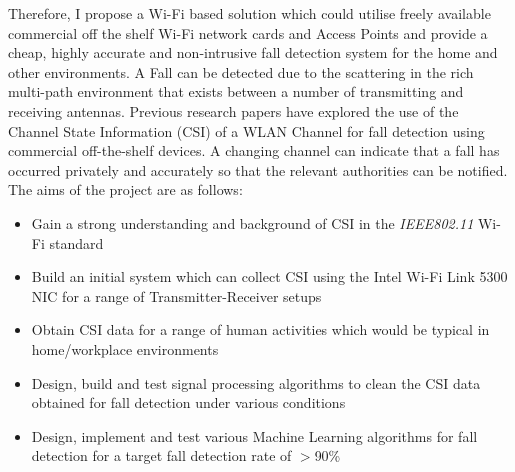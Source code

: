 Therefore, I propose a Wi-Fi based solution which could utilise freely available commercial off the shelf Wi-Fi network cards and Access Points and provide a cheap, highly accurate and non-intrusive fall detection system for the home and other environments. A Fall can be detected due to the scattering in the rich multi-path environment that exists between a number of transmitting and receiving antennas. Previous research papers have explored the use of the Channel State Information (CSI) of a WLAN Channel for fall detection using commercial off-the-shelf devices. A changing channel can indicate that a fall has occurred privately and accurately so that the relevant authorities can be notified. \\
The aims of the project are as follows: 
\begin{itemize}[noitemsep, topsep=0pt]
\item Gain a strong understanding and background of CSI in the \textit{IEEE802.11} Wi-Fi standard 
\item Build an initial system which can collect CSI using the Intel Wi-Fi Link 5300 NIC for a range of Transmitter-Receiver setups
\item Obtain CSI data for a range of human activities which would be typical in home/workplace environments
\item Design, build and test signal processing algorithms to clean the CSI data obtained for fall detection under various conditions
\item Design, implement and test various Machine Learning algorithms for fall detection for a target fall detection rate of $>$90\%
\end{itemize}
